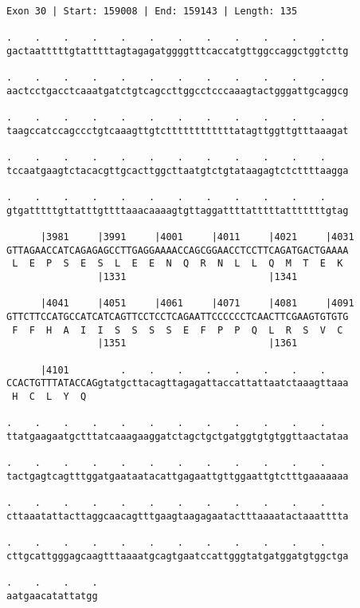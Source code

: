 \documentclass{article}
\begin{document}
\begin{Verbatim}
Exon 30 | Start: 159008 | End: 159143 | Length: 135
 
.    .    .    .    .    .    .    .    .    .    .    .    
gactaatttttgtatttttagtagagatggggtttcaccatgttggccaggctggtcttg
  
.    .    .    .    .    .    .    .    .    .    .    .    
aactcctgacctcaaatgatctgtcagccttggcctcccaaagtactgggattgcaggcg
  
.    .    .    .    .    .    .    .    .    .    .    .    
taagccatccagccctgtcaaagttgtcttttttttttttatagttggttgtttaaagat
  
.    .    .    .    .    .    .    .    .    .    .    .    
tccaatgaagtctacacgttgcacttggcttaatgtctgtataagagtctcttttaagga
  
.    .    .    .    .    .    .    .    .    .    .    .    
gtgatttttgttatttgttttaaacaaaagtgttaggattttatttttatttttttgtag
  
      |3981     |3991     |4001     |4011     |4021     |4031
GTTAGAACCATCAGAGAGCCTTGAGGAAAACCAGCGGAACCTCCTTCAGATGACTGAAAA
 L  E  P  S  E  S  L  E  E  N  Q  R  N  L  L  Q  M  T  E  K 
                |1331                         |1341         
  
      |4041     |4051     |4061     |4071     |4081     |4091
GTTCTTCCATGCCATCATCAGTTCCTCCTCAGAATTCCCCCCTCAACTTCGAAGTGTGTG
 F  F  H  A  I  I  S  S  S  S  E  F  P  P  Q  L  R  S  V  C 
                |1351                         |1361         
  
      |4101         .    .    .    .    .    .    .    .    
CCACTGTTTATACCAGgtatgcttacagttagagattaccattattaatctaaagttaaa
 H  C  L  Y  Q                                              
  
.    .    .    .    .    .    .    .    .    .    .    .    
ttatgaagaatgctttatcaaagaaggatctagctgctgatggtgtgtggttaactataa
  
.    .    .    .    .    .    .    .    .    .    .    .    
tactgagtcagtttggatgaataatacattgagaattgttggaattgtctttgaaaaaaa
  
.    .    .    .    .    .    .    .    .    .    .    .    
cttaaatattacttaggcaacagtttgaagtaagagaatactttaaaatactaaatttta
  
.    .    .    .    .    .    .    .    .    .    .    .    
cttgcattgggagcaagtttaaaatgcagtgaatccattgggtatgatggatgtggctga
  
.    .    .    .
aatgaacatattatgg
\end{Verbatim}
\newpage
\end{document}
